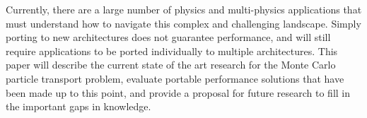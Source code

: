 %
Currently, there are a large number of physics and multi-physics applications that must understand how to navigate this complex and challenging landscape.
%
Simply porting to new architectures does not guarantee performance, and will still require applications to be ported individually to multiple architectures.
%
This paper will describe the current state of the art research for the Monte Carlo particle transport problem, evaluate portable performance solutions that have been made up to this point, and provide a proposal for future research to fill in the important gaps in knowledge.
%

